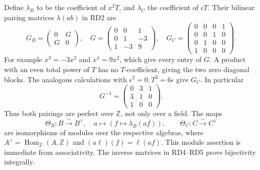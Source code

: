 \documentclass[
  10pt,
  a4paper,
]{article}
\begin{document}
Define \(\lambda_B\) to be the coefficient of \(x^2T\), and
\(\lambda_C\) the coefficient of \(\epsilon T\). Their bilinear pairing
matrices \(\lambda(ab)\) in RD2 are \[
G_B=\begin{pmatrix}0&G\\G&0\end{pmatrix},
\quad
G=\begin{pmatrix}0&0&1\\0&1&-3\\1&-3&9\end{pmatrix},
\quad
G_C=\begin{pmatrix}0&0&0&1\\0&0&1&0\\0&1&0&0\\1&0&0&0\end{pmatrix}.
\tag{RD4}
\] For example \(x^3=-3x^2\) and \(x^4=9x^2\), which give every entry of
\(G\). A product with an even total power of \(T\) has no
\(T\)-coefficient, giving the two zero diagonal blocks. The analogous
calculations with \(\epsilon^2=0,T^2=6\epsilon\) give \(G_C\). In
particular \[
G^{-1}=\begin{pmatrix}0&3&1\\3&1&0\\1&0&0\end{pmatrix}.
\tag{RD5}
\] Thus both pairings are perfect over \(\mathbb Z\), not only over a
field. The maps \[
\Theta_B:B\xrightarrow{\sim}B^\vee,\quad
a\mapsto(f\mapsto\lambda_B(af)),\qquad
\Theta_C:C\xrightarrow{\sim}C^\vee
\tag{RD6}
\] are isomorphisms of modules over the respective algebras, where
\(A^\vee=\operatorname{Hom}_{\mathbb Z}(A,\mathbb Z)\) and
\((a\ell)(f)=\ell(af)\). This module assertion is immediate from
associativity. The inverse matrices in RD4--RD5 prove bijectivity
integrally.
\end{document}

